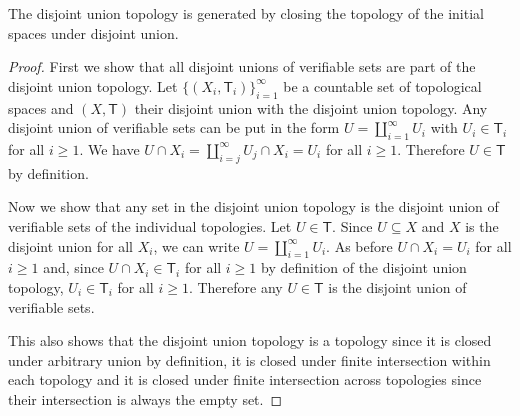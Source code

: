 \documentclass[11pt,letterpaper,fleqn]{memoir} %
\begin{document}
\begin{mathSection}
	\begin{prop}\label{prop_disjoint_union_topology_is_closure}
		The disjoint union topology is generated by closing the topology of the initial spaces under disjoint union.
	\end{prop}
    \begin{proof}
		First we show that all disjoint unions of verifiable sets are part of the disjoint union topology. Let $\{(X_i, \mathsf{T}_i)\}_{i=1}^{\infty}$ be a countable set of topological spaces and $(X, \mathsf{T})$ their disjoint union with the disjoint union topology. Any disjoint union of verifiable sets can be put in the form $U=\coprod\limits_{i=1}^{\infty} U_i$ with $U_i \in \mathsf{T}_i$ for all $i \geq 1$. We have $U \cap X_i = \coprod\limits_{i=j}^{\infty} U_j \cap X_i = U_i$ for all $i \geq 1$. Therefore $U \in \mathsf{T}$ by definition.
		
		Now we show that any set in the disjoint union topology is the disjoint union of verifiable sets of the individual topologies. Let $U \in \mathsf{T}$. Since $U \subseteq X$ and $X$ is the disjoint union for all $X_i$, we can write $U=\coprod\limits_{i=1}^{\infty} U_i$. As before $U \cap X_i = U_i$ for all $i \geq 1$ and, since $U \cap X_i \in \mathsf{T}_i$ for all $i \geq 1$ by definition of the disjoint union topology, $U_i \in \mathsf{T}_i$ for all $i \geq 1$. Therefore any $U \in \mathsf{T}$ is the disjoint union of verifiable sets.
		
		This also shows that the disjoint union topology is a topology since it is closed under arbitrary union by definition, it is closed under finite intersection within each topology and it is closed under finite intersection across topologies since their intersection is always the empty set.
    \end{proof}


\end{mathSection}
\end{document}
